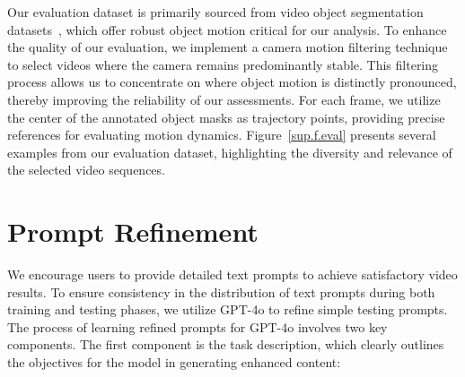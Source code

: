 Our evaluation dataset is primarily sourced from video object segmentation datasets~\cite{yt2021,qi2022occluded,pont2017}, which offer robust object motion critical for our analysis. To enhance the quality of our evaluation, we implement a camera motion filtering technique to select videos where the camera remains predominantly stable. This filtering process allows us to concentrate on where object motion is distinctly pronounced, thereby improving the reliability of our assessments. For each frame, we utilize the center of the annotated object masks as trajectory points, providing precise references for evaluating motion dynamics. Figure~\ref{sup.f.eval} presents several examples from our evaluation dataset, highlighting the diversity and relevance of the selected video sequences.







\section{Prompt Refinement}\label{sup.prompt}
We encourage users to provide detailed text prompts to achieve satisfactory video results. To ensure consistency in the distribution of text prompts during both training and testing phases, we utilize GPT-4o to refine simple testing prompts. The process of learning refined prompts for GPT-4o involves two key components. The first component is the task description, which clearly outlines the objectives for the model in generating enhanced content:

